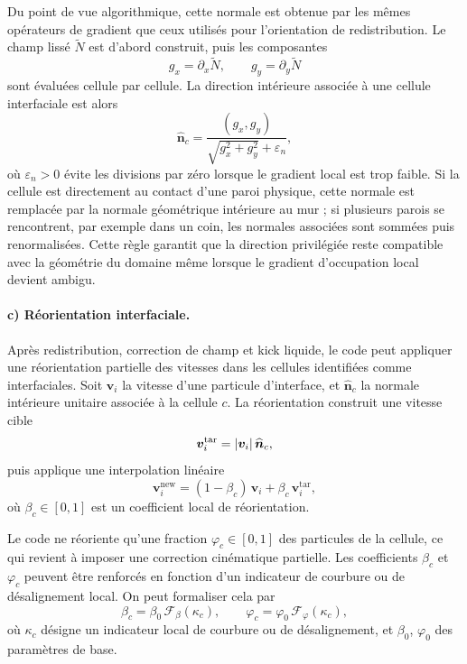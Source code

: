 \documentclass[11pt,a4paper]{article}
\begin{document}
Du point de vue algorithmique, cette normale est obtenue par les mêmes opérateurs de gradient que ceux utilisés pour l'orientation de redistribution. Le champ lissé $\widetilde N$ est d'abord construit, puis les composantes
\begin{equation}
  g_x = \partial_x \widetilde N,
  \qquad
  g_y = \partial_y \widetilde N
\end{equation}
sont évaluées cellule par cellule. La direction intérieure associée à une cellule interfaciale est alors
\begin{equation}
  \widehat{\bm n}_c = \frac{(g_x,g_y)}{\sqrt{g_x^2+g_y^2}+\varepsilon_n},
\end{equation}
où $\varepsilon_n>0$ évite les divisions par zéro lorsque le gradient local est trop faible. Si la cellule est directement au contact d'une paroi physique, cette normale est remplacée par la normale géométrique intérieure au mur ; si plusieurs parois se rencontrent, par exemple dans un coin, les normales associées sont sommées puis renormalisées. Cette règle garantit que la direction privilégiée reste compatible avec la géométrie du domaine même lorsque le gradient d'occupation local devient ambigu.

\paragraph{c) Réorientation interfaciale.}
Après redistribution, correction de champ et kick liquide, le code peut appliquer une réorientation partielle des vitesses dans les cellules identifiées comme interfaciales. Soit $\bm{v}_i$ la vitesse d'une particule d'interface, et $\widehat{\bm{n}}_c$ la normale intérieure unitaire associée à la cellule $c$. La réorientation construit une vitesse cible
\begin{equation}
  \bm{v}_i^{\mathrm{tar}} = \abs{\bm{v}_i}\,\widehat{\bm{n}}_c,
\end{equation}
puis applique une interpolation linéaire
\begin{equation}
  \bm{v}_i^{\mathrm{new}} = (1-\beta_c)\,\bm{v}_i + \beta_c\,\bm{v}_i^{\mathrm{tar}},
\end{equation}
où $\beta_c\in[0,1]$ est un coefficient local de réorientation.

Le code ne réoriente qu'une fraction $\varphi_c\in[0,1]$ des particules de la cellule, ce qui revient à imposer une correction cinématique partielle. Les coefficients $\beta_c$ et $\varphi_c$ peuvent être renforcés en fonction d'un indicateur de courbure ou de désalignement local. On peut formaliser cela par
\begin{equation}
  \beta_c = \beta_0\,\mathcal{F}_\beta(\kappa_c),
  \qquad
  \varphi_c = \varphi_0\,\mathcal{F}_\varphi(\kappa_c),
\end{equation}
où $\kappa_c$ désigne un indicateur local de courbure ou de désalignement, et $\beta_0$, $\varphi_0$ des paramètres de base.
\end{document}
